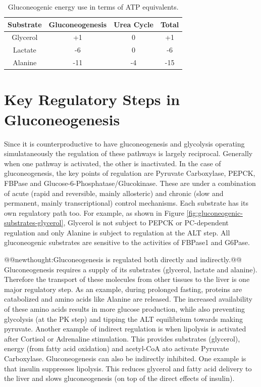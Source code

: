 \documentclass{tufte-handout}
\makeatletter
\def\newthought#1{@@newthought:#1@@}
\makeatother
\begin{document}
\begin{table}
\centering
\caption{Gluconeogenic energy use in terms of ATP equivalents.}
\label{tab:gluconeogenesis-energetics}
\begin{tabular}{cccc}
\hline
\textbf {Substrate} & \textbf{Gluconeogenesis}  & \textbf{Urea Cycle} & \textbf{Total}\\
\hline
Glycerol & +1 & 0 & +1\\
Lactate & -6 & 0 & -6 \\
Alanine & -11 & -4 & -15\\
\hline
\end{tabular}
\end{table}

\section{Key Regulatory Steps in Gluconeogenesis}

Since it is counterproductive to have gluconeogenesis and glycolysis operating simulataneously the regulation of these pathways is largely reciprocal.  Generally when one pathway is activated, the other is inactivated.  In the case of gluconeogenesis, the key points of regulation are Pyruvate Carboxylase, PEPCK, FBPase and Glucose-6-Phosphatase/Glucokinase.  These are under a combination of acute (rapid and reversible, mainly allosteric) and chronic (slow and permanent, mainly transcriptional) control mechanisms. Each substrate has its own regulatory path too.  For example, as shown in Figure \ref{fig:gluconeogenic-substrates-glycerol}, Glycerol is not subject to PEPCK or PC-dependent regulation and only Alanine is subject to regulation at the ALT step.  All gluconeogenic substrates are sensitive to the activities of FBPase1 and G6Pase.  

\newthought{Gluconeogenesis is regulated both directly and indirectly.}  Gluconeogenesis requires a supply of its substrates (glycerol, lactate and alanine).  Therefore the transport of these molecules from other tissues to the liver is one major regulatory step.  As an example, during prolonged fasting, proteins are catabolized and amino acids like Alanine are released.  The increased availability of these amino acids results in more glucose production, while also preventing glycolysis (at the PK step) and tipping the ALT equilibrium towards making pyruvate.  Another example of indirect regulation is when lipolysis is activated after Cortisol or Adrenaline stimulation.  This provides substrates (glycerol), energy (from fatty acid oxidation) and acetyl-CoA ato activate Pyruvate Carboxylase.  Gluconeogenesis can also be indirectly inhibited.  One example is that insulin suppresses lipolysis.  This reduces glycerol and fatty acid delivery to the liver and slows gluconeogenesis (on top of the direct effects of insulin).
\end{document}
